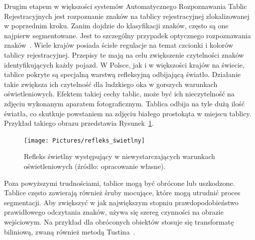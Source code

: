 Drugim etapem w większości systemów Automatycznego Rozpoznawania Tablic Rejestracyjnych jest rozpoznanie znaków na tablicy rejestracyjnej zlokalizowanej w poprzednim kroku.
Zanim dojdzie do klasyfikacji znaków, często są one najpierw segmentowane.
Jest to szczególny przypadek optycznego rozpoznawania znaków~\cite{9310202}.
Wiele krajów posiada ścisłe regulacje na temat czcionki i kolorów tablicy rejestracyjnej.
Przepisy te mają na celu zwiększenie czytelności znaków identyfikujących każdy pojazd.
W Polsce, jak \linebreak i w większości krajów na świecie, tablice pokryte są specjalną warstwą refleksyjną odbijającą światło.
Działanie takie zwiększa ich czytelność dla ludzkiego oka w gorszych warunkach oświetleniowych.
Efektem takiej cechy tablic, może być ich nieczytelność na zdjęciu wykonanym aparatem fotograficznym.
Tablica odbija na tyle dużą ilość światła, co skutkuje powstaniem na zdjęciu białego prostokąta w miejscu tablicy.
Przykład takiego obrazu przedstawia Rysunek~\ref{fig:refleks_swietlny}.
\begin{figure}[!ht]
    \centering
    \texttt{[image: Pictures/refleks\_świetlny]}
    \caption{Refleks świetlny występujący w niewystarczających warunkach oświetleniowych (źródło: opracowanie własne).}
    \label{fig:refleks_swietlny}
\end{figure}
\FloatBarrier
Poza powyższymi trudnościami, tablice mogą być obrócone lub uszkodzone.
Tablice często zawierają również śruby mocujące, które mogą utrudnić proces segmentacji.
Aby zwiększyć w jak największym stopniu prawdopodobieństwo prawidłowego odczytania znaków, używa się szereg czynności na obrazie wejściowym.
Na przykład dla obróconych obiektów stosuje się transformatę biliniową, zwaną również metodą Tustina~\cite{Xu2006AMO}.

